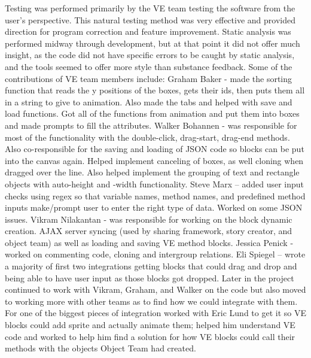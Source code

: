 \documentclass[a4paper]{article}
\begin{document}
Testing was performed primarily by the VE team testing the software from the user's perspective.  This natural testing method was very effective and provided direction for program correction and feature improvement.  Static analysis was performed midway through development, but at that point it did not offer much insight, as the code did not have specific errors to be caught by static analysis, and the tools seemed to offer more style than substance feedback.\newline \newline 
Some of the contributions of VE team members include: \newline \newline 
Graham Baker - made the sorting function that reads the y positions of the boxes, gets their ids, then puts them all in a string to give to animation. Also made the tabs and helped with save and load functions. Got all of the functions from animation and put them into boxes and made prompts to fill the attributes. \newline \newline 
Walker Bohannen - was responsible for most of the functionality with the double-click, drag-start, drag-end methods. Also co-responsible for the saving and loading of JSON code so blocks can be put into the canvas again. Helped implement canceling of boxes, as well cloning when dragged over the line. Also helped implement the grouping of text and rectangle objects with auto-height and -width functionality. \newline \newline 
Steve Marx – added user input checks using regex so that variable names, method names, and predefined method inputs make/prompt user to enter the right type of data.  Worked on some JSON issues.  \newline \newline 
Vikram Nilakantan - was responsible for working on the block dynamic creation. AJAX server syncing (used by sharing framework, story creator, and object team) as well as loading and saving VE method blocks.\newline \newline 
Jessica Penick  - worked on commenting code, cloning and intergroup relations.\newline \newline 
Eli Spiegel – wrote a majority of first two integrations getting blocks that could drag and drop and being able to have user input as those blocks got dropped. Later in the project continued to work with Vikram, Graham, and Walker on the code but also moved to working more with other teams as to find how we could integrate with them. For one of the biggest pieces of integration worked with Eric Lund to get it so VE blocks could add sprite and actually animate them; helped him understand VE code and worked to help him find a solution for how VE blocks could call their methods with the objects Object Team had created.\newline \newline 
\end{document}
